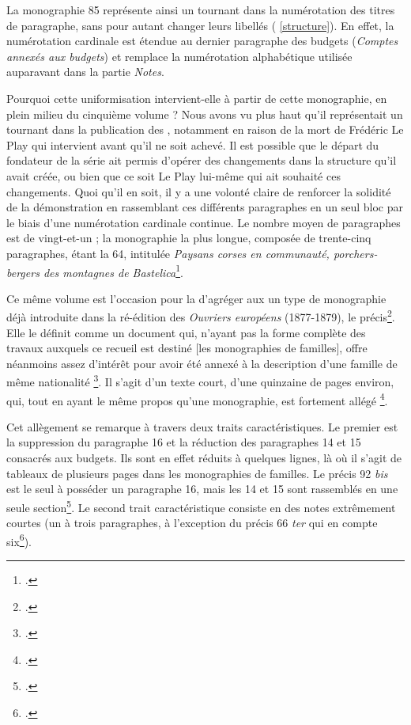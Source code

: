 La monographie \no{} 85 représente ainsi un tournant dans la numérotation des titres de paragraphe, sans pour autant changer leurs libellés (\ann{} \ref{structure}). En effet, la numérotation cardinale est étendue au dernier paragraphe des budgets (\textit{Comptes annexés aux budgets}) et remplace la numérotation alphabétique utilisée auparavant dans la partie \textit{Notes}.

Pourquoi cette uniformisation intervient-elle à partir de cette monographie, en plein milieu du cinquième volume ? Nous avons vu plus haut qu'il représentait un tournant dans la publication des \odm, notamment en raison de la mort de Frédéric Le Play qui intervient avant qu'il ne soit achevé. Il est possible que le départ du fondateur de la série ait permis d'opérer des changements dans la structure qu'il avait créée, ou bien que ce soit Le Play lui-même qui ait souhaité ces changements. Quoi qu'il en soit, il y a une volonté claire de renforcer la solidité de la démonstration en rassemblant ces différents paragraphes en un seul bloc par le biais d'une numérotation cardinale continue. Le nombre moyen de paragraphes est de vingt-et-un ; la monographie la plus longue, composée de trente-cinq paragraphes, étant la \no{} 64, intitulée \textit{Paysans corses en communauté, porchers-bergers des montagnes de Bastelica}\footcite{mono064a}.

Ce même volume est l'occasion pour la \sess{} d'agréger aux \odm{} un type de monographie déjà introduite dans la ré-édition des \textit{Ouvriers européens} (1877-1879), le précis\footcite[p. 102]{lorry}. Elle le définit comme un document qui, \og n'ayant pas la forme complète des travaux auxquels ce recueil est destiné [les monographies de familles], offre néanmoins assez d'intérêt pour avoir été annexé à la description d'une famille de même nationalité \fg{}\footcite[p. II]{averts2t1}. Il s'agit d'un texte court, d'une quinzaine de pages environ, qui, tout en ayant le même propos qu'une monographie, est fortement \og allégé \fg{}\footcite[p. 7]{chenu}.

Cet allègement se remarque à travers deux traits caractéristiques. Le premier est la suppression du paragraphe 16 et la réduction des paragraphes 14 et 15 consacrés aux budgets. Ils sont en effet réduits à quelques lignes, là où il s'agit de tableaux de plusieurs pages dans les  monographies de familles. Le précis \no{} 92 \textit{bis} est le seul à posséder un paragraphe 16, mais les 14 et 15 sont rassemblés en une seule section\footcite[p. 78-81]{mono092b}. Le second trait caractéristique consiste en des notes extrêmement courtes (un à trois paragraphes, à l'exception du précis \no{} 66 \textit{ter} qui en compte six\footcite[p. 158-172]{mono066c}).

